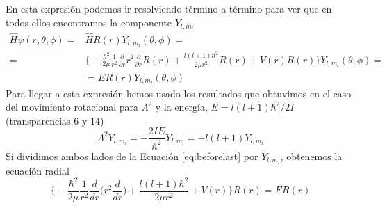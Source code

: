 \documentclass[notitlepage, amsmath,amssymb,
 aps,12pt,tightenlines]{revtex4-1}
\begin{document}
En esta expresión podemos ir resolviendo término a término para ver
que en todos ellos encontramos la componente $Y_{l,m_l}$
\begin{equation}
   \begin{split}
       \hat{H}\psi(r,\theta,\phi)=&\hat{H}R(r) Y_{l,m_l}(\theta, \phi)=\\ =&\bigg\{-\frac{\hbar^2}{2\mu} \frac{1}{r^2}\frac{\partial}{\partial r}r^2\frac{\partial}{\partial r} R(r) 
 +  \frac{l(l+1)\hbar^2}{2\mu r^2} R(r) 
 + V(r)R(r) \bigg\}Y_{l,m_l}(\theta, \phi)=\\
     &=ER(r) Y_{l,m_l}(\theta, \phi)
   \end{split}
   \label{eq:beforelast}
\end{equation}
Para llegar a esta expresión hemos usado los resultados que obtuvimos
en el caso del movimiento rotacional para $\Lambda^2$ y la energía,
$E=l(l+1)\hbar^2/2I$ (transparencias 6 y 14)
\begin{equation}
    \Lambda^2Y_{l,m_l}=-\frac{2IE}{\hbar^2}Y_{l,m_l}= -l(l+1)Y_{l,m_l}
    \label{eq:rotor}
\end{equation}
Si dividimos ambos lados de la Ecuación \ref{eq:beforelast} 
por $Y_{l,m_l}$, obtenemos la ecuación radial 
\begin{equation}
    \bigg\{-\frac{\hbar^2}{2\mu}\frac{1}{r^2}\frac{d}{dr}\bigg(r^2\frac{d}{dr}\bigg) + \frac{l(l+1)\hbar^2}{2\mu r^2} + V(r)\bigg\}R(r)=ER(r)
\end{equation}
\end{document}
